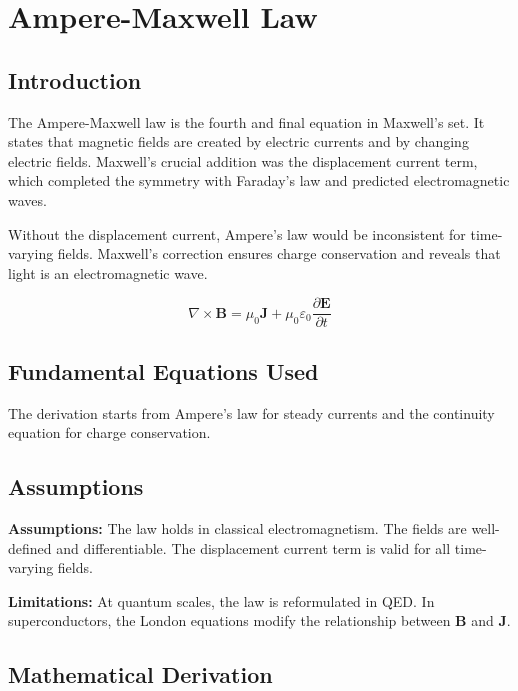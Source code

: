 \chapter{Ampere-Maxwell Law}

\section*{Introduction}

The Ampere-Maxwell law is the fourth and final equation in Maxwell's set. It states that magnetic fields are created by electric currents and by changing electric fields. Maxwell's crucial addition was the displacement current term, which completed the symmetry with Faraday's law and predicted electromagnetic waves.

Without the displacement current, Ampere's law would be inconsistent for time-varying fields. Maxwell's correction ensures charge conservation and reveals that light is an electromagnetic wave.

\begin{equation}
\boxed{\nabla \times \mathbf{B} = \mu_0 \mathbf{J} + \mu_0 \varepsilon_0 \frac{\partial \mathbf{E}}{\partial t}}
\end{equation}

\section*{Fundamental Equations Used}

The derivation starts from Ampere's law for steady currents and the continuity equation for charge conservation.

\section*{Assumptions}

\textbf{Assumptions:} The law holds in classical electromagnetism. The fields are well-defined and differentiable. The displacement current term is valid for all time-varying fields.

\textbf{Limitations:} At quantum scales, the law is reformulated in QED. In superconductors, the London equations modify the relationship between $\mathbf{B}$ and $\mathbf{J}$.

\section*{Mathematical Derivation}

